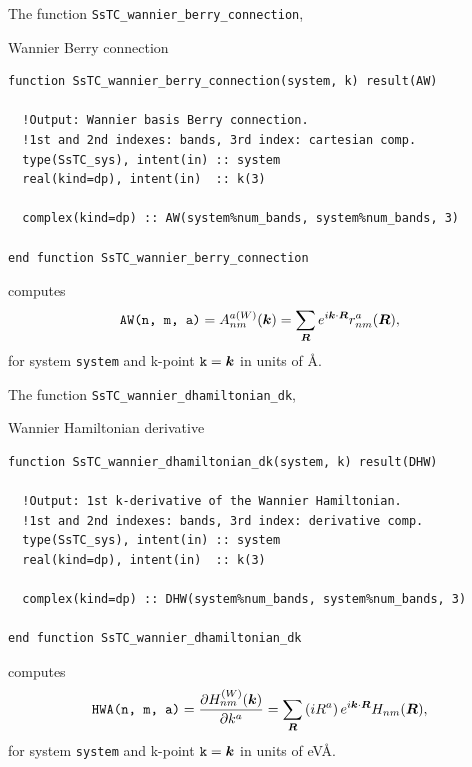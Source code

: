 \documentclass[10pt,a4paper]{article}
\begin{document}
The function \verb|SsTC_wannier_berry_connection|,
\begin{codebox}{Wannier Berry connection}
\begin{lstlisting}[caption={Interface of ``Wannier Berry connection".},captionpos=b]
function SsTC_wannier_berry_connection(system, k) result(AW)

  !Output: Wannier basis Berry connection.
  !1st and 2nd indexes: bands, 3rd index: cartesian comp.
  type(SsTC_sys), intent(in) :: system
  real(kind=dp), intent(in)  :: k(3)

  complex(kind=dp) :: AW(system%num_bands, system%num_bands, 3)
  
end function SsTC_wannier_berry_connection
\end{lstlisting}
\end{codebox}
computes
\begin{equation}
\verb|AW(n, m, a)| = A_{nm}^{a(W)}(\bm{k}) = \sum_{\bm{R}} e^{i\bm{k}\cdot\bm{R}} r^a_{nm}(\bm{R}),
\end{equation}
for system \verb|system| and k-point $\verb|k| = \bm{k}$ in units of \r{A}.

The function \verb|SsTC_wannier_dhamiltonian_dk|,
\begin{codebox}{Wannier Hamiltonian derivative}
\begin{lstlisting}[caption={Interface of ``Wannier Hamiltonian's derivative".},captionpos=b]
function SsTC_wannier_dhamiltonian_dk(system, k) result(DHW)

  !Output: 1st k-derivative of the Wannier Hamiltonian.
  !1st and 2nd indexes: bands, 3rd index: derivative comp.
  type(SsTC_sys), intent(in) :: system
  real(kind=dp), intent(in)  :: k(3)

  complex(kind=dp) :: DHW(system%num_bands, system%num_bands, 3)
  
end function SsTC_wannier_dhamiltonian_dk
\end{lstlisting}
\end{codebox}
computes
\begin{equation}
\verb|HWA(n, m, a)| = \frac{\partial H_{nm}^{(W)}(\bm{k})}{\partial k^a} = \sum_{\bm{R}}\left(iR^a \right) e^{i\bm{k}\cdot\bm{R}} H_{nm}(\bm{R}),
\end{equation}
for system \verb|system| and k-point $\verb|k| = \bm{k}$ in units of eV\r{A}.
\end{document}
